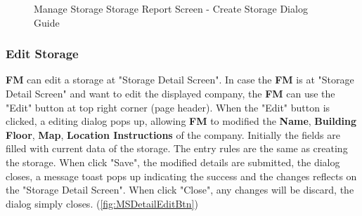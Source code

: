 \begin{figure}[H]
    \vspace{10pt}
    
    \caption{Manage Storage Storage Report Screen - Create Storage Dialog Guide}
	\label{fig:MSreportCreateGuide}
\end{figure}


\subsubsection{Edit Storage}

\textbf{FM} can edit a storage at "Storage Detail Screen".
In case the \textbf{FM} is at "Storage Detail Screen" and want to edit the displayed company, the \textbf{FM} can use the "Edit" button at top right corner (page header). 
When the "Edit" button is clicked, a editing dialog pops up, allowing \textbf{FM} to modified the \textbf{Name}, \textbf{Building Floor}, \textbf{Map}, \textbf{Location Instructions} of the company. Initially the fields are filled with current data of the storage. The entry rules are the same as creating the storage.
When click "Save", the modified details are submitted, the dialog closes, a message toast pops up indicating the success and the changes reflects on the "Storage Detail Screen". When click "Close", any changes will be discard, the dialog simply closes.
(\autoref{fig:MSDetailEditBtn})

